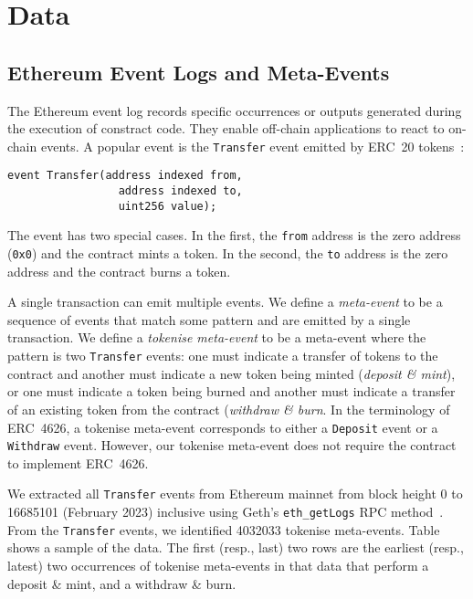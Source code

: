 \section{Data}\label{sec:data}

\subsection{Ethereum Event Logs and Meta-Events}\label{sec:data-event-logs}

The Ethereum event log records specific occurrences or outputs
generated during the execution of constract code.  They enable
off-chain applications to react to on-chain events.  A popular event
is the \texttt{Transfer} event emitted by {ERC}~20
tokens~\cite{vogelsteller-buterin-15}:

\begin{lstlisting}[language=Solidity,
    caption={The {ERC}~20 \texttt{Transfer} event specifies three
      parameters: \texttt{from}, \texttt{to}, and \texttt{value}.}]
  event Transfer(address indexed from,
                 address indexed to,
                 uint256 value);
\end{lstlisting}

The event has two special cases.  In the first, the \texttt{from}
address is the zero address (\texttt{0x0}) and the contract mints a
token.  In the second, the \texttt{to} address is the zero address and
the contract burns a token.

A single transaction can emit multiple events.  We define a
\textit{meta-event} to be a sequence of events that match some pattern
and are emitted by a single transaction.  We define a \textit{tokenise
  meta-event} to be a meta-event where the pattern is two
\texttt{Transfer} events: one must indicate a transfer of tokens to
the contract and another must indicate a new token being minted
(\textit{deposit \& mint}), or one must indicate a token being burned
and another must indicate a transfer of an existing token from the
contract (\textit{withdraw \& burn}.  In the terminology of
{ERC}~4626, a tokenise meta-event corresponds to either a
\texttt{Deposit} event or a \texttt{Withdraw} event.  However, our
tokenise meta-event does not require the contract to implement
{ERC}~4626.

We extracted all \texttt{Transfer} events from Ethereum mainnet from
block height \num{0} to \num{16685101} (February 2023) inclusive using
Geth's \texttt{eth\_getLogs} RPC method~\cite{geth-xx}.  From the
\texttt{Transfer} events, we identified \num{4032033} tokenise
meta-events.  Table~\cite{tab:meta-events} shows a sample of the data.
The first (resp., last) two rows are the earliest (resp., latest) two
occurrences of tokenise meta-events in that data that perform a
deposit \& mint, and a withdraw \& burn.

